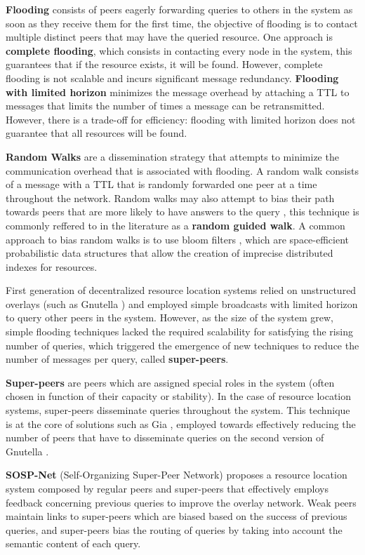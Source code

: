 \textbf{Flooding} consists of peers eagerly forwarding queries to others in the system as soon as they receive them for the first time, the objective of flooding is to contact multiple distinct peers that may have the queried resource. One approach is \textbf{complete flooding}, which consists in contacting every node in the system, this guarantees that if the resource exists, it will be found. However, complete flooding is not scalable and incurs significant message redundancy. \textbf{Flooding with limited horizon} minimizes the message overhead by attaching a TTL to messages that limits the number of times a message can be retransmitted. However, there is a trade-off for efficiency: flooding with limited horizon does not guarantee that all resources will be found. 

\textbf{Random Walks} are a dissemination strategy that attempts to minimize the communication overhead that is associated with flooding. A random walk consists of a message with a TTL that is randomly forwarded one peer at a time throughout the network. Random walks may also attempt to bias their path towards peers that are more likely to have answers to the query \cite{1022239}, this technique is commonly reffered to in the literature as a \textbf{random guided walk}. A common approach to bias random walks is to use bloom filters \cite{5751342}, which are space-efficient probabilistic data structures that allow the creation of imprecise distributed indexes for resources.

First generation of decentralized resource location systems relied on unstructured overlays (such as Gnutella \cite{gnutella_gtk}) and employed simple broadcasts with limited horizon to query other peers in the system. However, as the size of the system grew, simple flooding techniques lacked the required scalability for satisfying the rising number of queries, which triggered the emergence of new techniques to reduce the number of messages per query, called \textbf{super-peers}. 

\textbf{Super-peers} are peers which are assigned special roles in the system (often chosen in function of their capacity or stability). In the case of resource location systems, super-peers disseminate queries throughout the system. This technique is at the core of solutions such as Gia \cite{Chawathe2003}, employed towards effectively reducing the number of peers that have to disseminate queries on the second version of Gnutella \cite{gnutella_gtk}. 

\textbf{SOSP-Net} \cite{garbacki2007optimizing} (Self-Organizing Super-Peer Network) proposes a resource location system composed by regular peers and super-peers that effectively employs feedback concerning previous queries to improve the overlay network. Weak peers maintain links to super-peers which are biased based on the success of previous queries, and super-peers bias the routing of queries by taking into account the semantic content of each query. 

